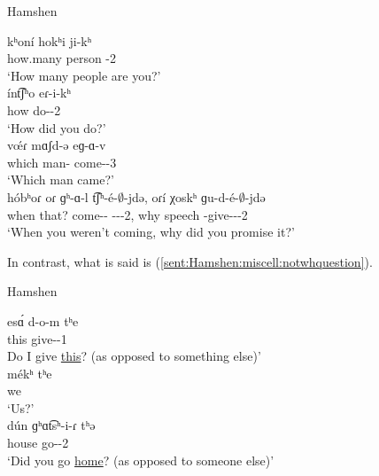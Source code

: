 \begin{exe}
	\ex Hamshen \label{sent:Hamshen:miscell:whquestion}
	\begin{xlist}
		\ex \gll kʰon\'i hokʰi ji-kʰ \\
		how.many person {\aux}-2{\pl} \\
		\trans `How many people are you?' \\
		\ex \gll \'int͡ʃʰo eɾ-i-kʰ \\
		how do-{\pst}-2{\pl} \\
		\trans `How did you do?' \\
		\ex \gll v\'œɾ mɑʃd-ə eɡ-ɑ-v \\
		which man-{} come-{\pst}-3{\sg} \\
		\trans `Which man came?' \\
		\ex \gll h\'obʰoɾ oɾ ɡʰ-ɑ-l t͡ʃʰ-\'e-$\emptyset$-jdə, oɾ\'i χoskʰ ɡu-d-\'e-$\emptyset$-jdə \\
		when that? come-{\thgloss}-{\cn} {\neggloss}-{\aux}-{\pst}-2{\sg}, why speech {\ind}-give-{\thgloss}-{\pst}-2{\sg} \\
		\trans `When you weren't coming, why did you promise it?' \\
		
	\end{xlist}
\end{exe}





In contrast, what is said is (\ref{sent:Hamshen:miscell:notwhquestion}). 

\begin{exe}
	\ex Hamshen\label{sent:Hamshen:miscell:notwhquestion}
	\begin{xlist}
		\ex \gll es\'ɑ d-o-m tʰe \\
		this give-{\thgloss}-1{\sg} {\q} \\
		\trans Do I give \underline{this}? (as opposed to something else)' \\
		\armenian{էսա՞ դօմ թէ}
		\ex \gll m\'ekʰ tʰe \\
		we {\q} \\
		\trans `Us?' \\
		\armenian{մէ՞ք թէ}
		\ex \gll d\'un ɡʰɑt͡sʰ-i-ɾ tʰə \\
		house go-{\pst}-2{\sg} {\q} \\
		\trans `Did you go \underline{home}? (as opposed to someone else)'\\
		
		
	\end{xlist}
\end{exe}

